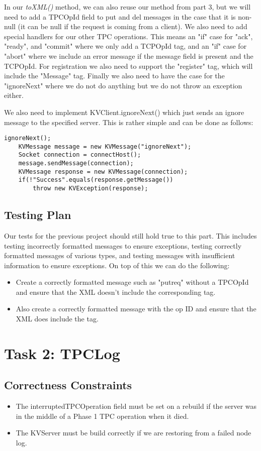 \documentclass{article}
\begin{document}
In our \textit{toXML()} method, we can also reuse our method from part 3, but we will need to add a TPCOpId field to put
and del messages in the case that it is non-null (it can be null if the request is coming from a client). We also need
to add special handlers for our other TPC operations. This means an "if" case for "ack", "ready", and "commit" where we
only add a TCPOpId tag, and an "if" case for "abort" where we include an error message if the message field is present
and the TCPOpId. For registration we also need to support the "register" tag, which will include the "Message" tag.
Finally we also need to have the case for the "ignoreNext" where we do not do anything but we do not throw an exception
either.

We also need to implement KVClient.ignoreNext() which just sends an ignore message to the specified server. This is
rather simple and can be done as follows:
\begin{verbatim}
ignoreNext();
    KVMessage message = new KVMessage("ignoreNext");
    Socket connection = connectHost();
    message.sendMessage(connection);
    KVMessage response = new KVMessage(connection);
    if(!"Success".equals(response.getMessage())
        throw new KVException(response);
\end{verbatim}

\subsection*{Testing Plan}
Our tests for the previous project should still hold true to this part. This includes testing incorrectly formatted
messages to ensure exceptions, testing correctly formatted messages of various types, and testing messages with
insufficient information to ensure exceptions. On top of this we can do the following:
\begin{itemize}
\item Create a correctly formatted message such as "putreq" without a TPCOpId and ensure that the XML doesn't include
the corresponding tag.
\item Also create a correctly formatted message with the op ID and ensure that the XML does include the tag.
\end{itemize}

\section*{Task 2: TPCLog}
\subsection*{Correctness Constraints}
\begin{itemize}
\item The interruptedTPCOperation field must be set on a rebuild if the server was in the middle of a Phase 1 TPC
operation when it died.
\item The KVServer must be build correctly if we are restoring from a failed node log.
\end{itemize}
\end{document}
